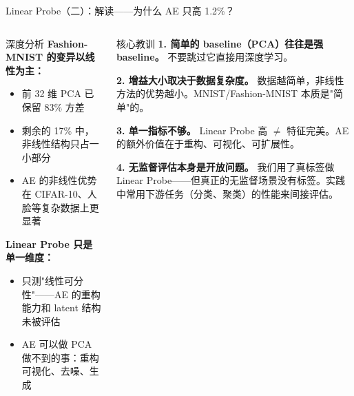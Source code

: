\documentclass[aspectratio=169]{ctexbeamer}
\begin{document}
\begin{frame}[shrink=10]{Linear Probe（二）：解读——为什么 AE 只高 1.2\%？}
\small

\begin{columns}[T]
\begin{block}{深度分析}
\footnotesize
\textbf{Fashion-MNIST 的变异以线性为主：}
\begin{itemize}
  \item 前 32 维 PCA 已保留 83\% 方差
  \item 剩余的 17\% 中，非线性结构只占一小部分
  \item AE 的非线性优势在 CIFAR-10、人脸等复杂数据上更显著
\end{itemize}

\textbf{Linear Probe 只是单一维度：}
\begin{itemize}
  \item 只测"线性可分性"——AE 的重构能力和 latent 结构未被评估
  \item AE 可以做 PCA 做不到的事：重构可视化、去噪、生成
\end{itemize}
\end{block}

\begin{alertblock}{核心教训}
\footnotesize
\textbf{1. 简单的 baseline（PCA）往往是强 baseline。} 不要跳过它直接用深度学习。

\textbf{2. 增益大小取决于数据复杂度。} 数据越简单，非线性方法的优势越小。MNIST/Fashion-MNIST 本质是"简单"的。

\textbf{3. 单一指标不够。} Linear Probe 高 $\neq$ 特征完美。AE 的额外价值在于重构、可视化、可扩展性。

\textbf{4. 无监督评估本身是开放问题。} 我们用了真标签做 Linear Probe——但真正的无监督场景没有标签。实践中常用下游任务（分类、聚类）的性能来间接评估。
\end{alertblock}
\end{columns}
\end{frame}
\end{document}
